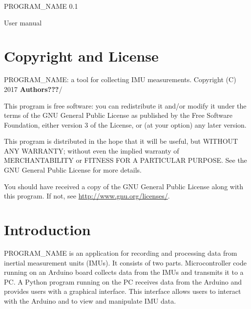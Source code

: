 \documentclass[11pt,letterpaper,article,oneside]{memoir}
\newcommand{\name}{PROGRAM\_NAME}
\newcommand{\programVersion}{0.1}
\newcommand{\manualVersion}{0.1}
\begin{document}
\thispagestyle{empty}

{%
\centering
\Large

\vspace*{\fill}

{\huge
\name{} \programVersion{}
}

{\LARGE
User manual \\
}
\vspace*{\fill}

}

\cleardoublepage

\tableofcontents*

\clearpage




\chapter{Copyright and License}

\name{}: a tool for collecting IMU measurements.
Copyright (C) 2017 \textbf{Authors???}/

This program is free software: you can redistribute it and/or modify
it under the terms of the GNU General Public License as published by
the Free Software Foundation, either version 3 of the License, or
(at your option) any later version.

This program is distributed in the hope that it will be useful,
but WITHOUT ANY WARRANTY; without even the implied warranty of
MERCHANTABILITY or FITNESS FOR A PARTICULAR PURPOSE.  See the
GNU General Public License for more details.

You should have received a copy of the GNU General Public License
along with this program.  If not, see \url{http://www.gnu.org/licenses/}.




\chapter{Introduction}

\name{} is an application for recording and processing data from inertial
measurement units (IMUs). It consists of two parts. Microcontroller code running
on an Arduino board collects data from the IMUs and transmits it to a PC. A
Python program running on the PC receives data from the Arduino and provides
users with a graphical interface. This interface allows users to interact with
the Arduino and to view and manipulate IMU data.
\end{document}

